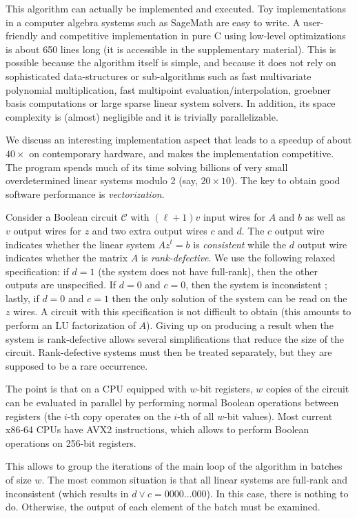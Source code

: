 \documentclass[a4paper,UKenglish,cleveref, autoref]{lipics-v2019}
\begin{document}
This algorithm can actually be implemented and executed. Toy implementations in
a computer algebra systems such as \textsf{SageMath} are easy to write. A
user-friendly and competitive implementation in pure C using low-level
optimizations is about 650 lines long (it is accessible in the supplementary
material). This is possible because the algorithm itself is simple, and because
it does not rely on sophisticated data-structures or sub-algorithms such as fast
multivariate polynomial multiplication, fast multipoint
evaluation/interpolation, groebner basis computations or large sparse linear
system solvers. In addition, its space complexity is (almost) negligible and it
is trivially parallelizable.

We discuss an interesting implementation aspect that leads to a speedup of about
$40 \times$ on contemporary hardware, and makes the implementation
competitive. The program spends much of its time solving billions of very small
overdetermined linear systems modulo 2 (say, $20 \times 10$). The key to obtain
good software performance is \emph{vectorization}.

Consider a Boolean circuit $\mathcal{C}$ with $(\ell+1)v$ input wires for $A$
and $b$ as well as $v$ output wires for $z$ and two extra output wires $c$ and
$d$. The $c$ output wire indicates whether the linear system $A z^t = b$ is
\emph{consistent} while the $d$ output wire indicates whether the matrix $A$ is
\emph{rank-defective}. We use the following relaxed specification: if $d=1$ (the
system does not have full-rank), then the other outputs are unspecified. If
$d=0$ and $c=0$, then the system is inconsistent ; lastly, if $d=0$ and $c=1$
then the only solution of the system can be read on the $z$ wires. A circuit
with this specification is not difficult to obtain (this amounts to perform an
LU factorization of $A$). Giving up on producing a result when the system is
rank-defective allows several simplifications that reduce the size of the
circuit. Rank-defective systems must then be treated separately, but they are
supposed to be a rare occurrence.

The point is that on a CPU equipped with $w$-bit registers, $w$ copies of the
circuit can be evaluated in parallel by performing normal Boolean operations
between registers (the $i$-th copy operates on the $i$-th of all $w$-bit
values). Most current \textsf{x86-64} CPUs have \textsf{AVX2} instructions,
which allows to perform Boolean operations on 256-bit registers.

This allows to group the iterations of the main loop of the algorithm in batches
of size $w$. The most common situation is that all linear systems are full-rank
and inconsistent (which results in $d \vee c = 0000 \dots 000$). In this case,
there is nothing to do. Otherwise, the output of each element of the batch must
be examined.


\end{document}
